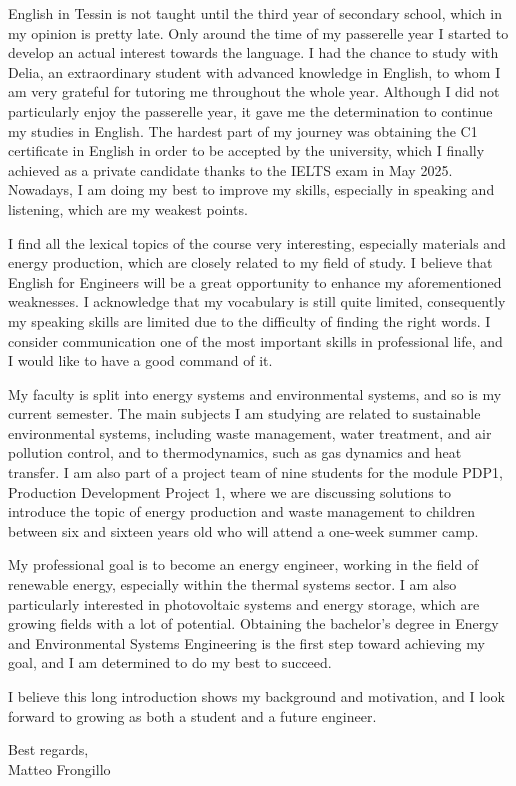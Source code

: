 \documentclass{article}
\begin{document}
English in Tessin is not taught until the third year of secondary school, which in my opinion
is pretty late.
Only around the time of my passerelle year I started to develop an actual interest towards the language.
I had the chance to study with Delia, an extraordinary student with advanced knowledge in English,
to whom I am very grateful for tutoring me throughout the whole year.
Although I did not particularly enjoy the passerelle year, it gave me the determination to
continue my studies in English.
The hardest part of my journey was obtaining the C1 certificate in English in order
to be accepted by the university, which I finally achieved as a private candidate thanks to
the IELTS exam in May 2025.
Nowadays, I am doing my best to improve my skills, especially in speaking and listening,
which are my weakest points.

I find all the lexical topics of the course very interesting, especially materials and
energy production, which are closely related to my field of study.
I believe that English for Engineers will be a great opportunity to enhance my
aforementioned weaknesses.
I acknowledge that my vocabulary is still quite limited, consequently my speaking skills
are limited due to the difficulty of finding the right words. I consider communication one of
the most important skills in professional life, and I would like to have a good command of it.

My faculty is split into energy systems and environmental systems, and so is my current
semester. The main subjects I am studying are related to sustainable environmental
systems, including waste management, water treatment, and air pollution control, and
to thermodynamics, such as gas dynamics and heat transfer.
I am also part of a project team of nine students for the module PDP1, Production
Development Project 1, where we are discussing solutions to introduce the topic of
energy production and waste management to children between six and sixteen years old who
will attend a one-week summer camp.

My professional goal is to become an energy engineer, working in the field of renewable
energy, especially within the thermal systems sector. I am also particularly interested
in photovoltaic systems and energy storage, which are growing fields with a lot of
potential.
Obtaining the bachelor's degree in Energy and Environmental Systems Engineering is the first
step toward achieving my goal, and I am determined to do my best to succeed.

I believe this long introduction shows my background and motivation, and I look forward
to growing as both a student and a future engineer.
\setlength{\parskip}{1.5em}

Best regards,\\
Matteo Frongillo
\end{document}

